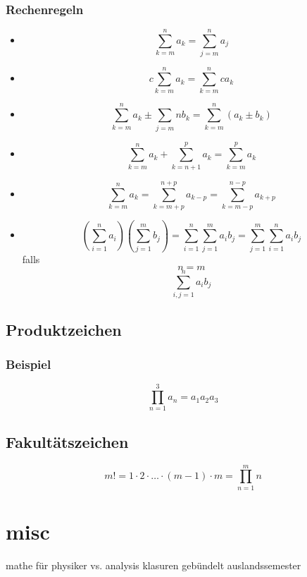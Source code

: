 \documentclass[11pt]{article}
\begin{document}
\subsubsection{Rechenregeln}
\label{sec-2-1-2}
\begin{itemize}
\item $$\sum_{k=m}^n a_k = \sum_{j=m}^n a_j$$
\item $$c\sum_{k=m}^n a_k = \sum_{k=m}^n c a_k$$
\item $$\sum_{k=m}^n a_k \pm \sum_{j=m}{n} b_k = \sum_{k=m}^n (a_k \pm b_k)$$
\item $$\sum_{k=m}^n a_k + \sum_{k=n+1}^p a_k = \sum_{k=m}^{p} a_k$$
\item $$\sum_{k=m}^n a_k = \sum_{k=m+p}^{n+p} a_{k-p} = \sum_{k=m-p}^{n-p} a_{k+p}$$
\item $$(\sum_{i=1}^n a_i)(\sum_{j=1}^m b_j) = \sum_{i=1}^n \sum_{j=1}^m a_i b_j = \sum_{j=1}^m \sum_{i=1}^n a_i b_j$$
      falls $$n=m$$ $$\sum_{i,j=1}^n a_i b_j$$
\end{itemize}

\subsection{Produktzeichen}
\label{sec-2-2}
\subsubsection{Beispiel}
\label{sec-2-2-1}
$$\prod_{n=1}^3 a_n = a_1 a_2 a_3$$

\subsection{Fakultätszeichen}
\label{sec-2-3}
$$m! = 1 \cdot 2 \cdot \ldots \cdot (m-1) \cdot m = \prod_{n=1}^m n$$

\section{misc}
\label{sec-3}
mathe für physiker vs. analysis
klasuren gebündelt
auslandssemester
\end{document}
